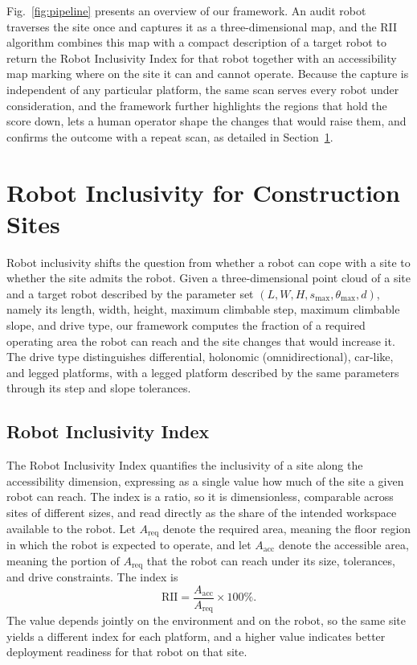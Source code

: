 \documentclass[a4paper, 10pt, conference]{ieeeconf}
\begin{document}
Fig.~\ref{fig:pipeline} presents an overview of our framework. An audit robot traverses the site once and captures it as a three-dimensional map, and the RII algorithm combines this map with a compact description of a target robot to return the Robot Inclusivity Index for that robot together with an accessibility map marking where on the site it can and cannot operate. Because the capture is independent of any particular platform, the same scan serves every robot under consideration, and the framework further highlights the regions that hold the score down, lets a human operator shape the changes that would raise them, and confirms the outcome with a repeat scan, as detailed in Section~\ref{sec:method}.
 
\section{Robot Inclusivity for Construction Sites}
\label{sec:method}
 
Robot inclusivity shifts the question from whether a robot can cope with a site to whether the site admits the robot. Given a three-dimensional point cloud of a site and a target robot described by the parameter set $(L, W, H, s_{\max}, \theta_{\max}, d)$, namely its length, width, height, maximum climbable step, maximum climbable slope, and drive type, our framework computes the fraction of a required operating area the robot can reach and the site changes that would increase it. The drive type distinguishes differential, holonomic (omnidirectional), car-like, and legged platforms, with a legged platform described by the same parameters through its step and slope tolerances.
 
\subsection{Robot Inclusivity Index}
\label{sec:rii_def}
The Robot Inclusivity Index quantifies the inclusivity of a site along the accessibility dimension, expressing as a single value how much of the site a given robot can reach. The index is a ratio, so it is dimensionless, comparable across sites of different sizes, and read directly as the share of the intended workspace available to the robot. Let $A_{\mathrm{req}}$ denote the required area, meaning the floor region in which the robot is expected to operate, and let $A_{\mathrm{acc}}$ denote the accessible area, meaning the portion of $A_{\mathrm{req}}$ that the robot can reach under its size, tolerances, and drive constraints. The index is
\begin{equation}
\mathrm{RII} = \frac{A_{\mathrm{acc}}}{A_{\mathrm{req}}} \times 100\%.
\label{eq:riih}
\end{equation}
The value depends jointly on the environment and on the robot, so the same site yields a different index for each platform, and a higher value indicates better deployment readiness for that robot on that site.
 
\end{document}
